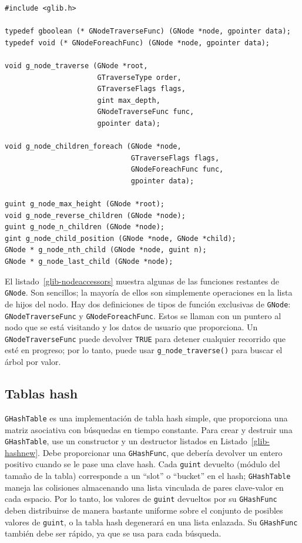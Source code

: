 \begin{lstlisting}[float, caption={Accediendo a un \lstinline{GNode}}, label=glib-nodeaccessors]
#include <glib.h>

typedef gboolean (* GNodeTraverseFunc) (GNode *node, gpointer data);
typedef void (* GNodeForeachFunc) (GNode *node, gpointer data);

void g_node_traverse (GNode *root,
                      GTraverseType order,
                      GTraverseFlags flags,
                      gint max_depth,
                      GNodeTraverseFunc func,
                      gpointer data);

void g_node_children_foreach (GNode *node,
                              GTraverseFlags flags,
                              GNodeForeachFunc func,
                              gpointer data);

guint g_node_max_height (GNode *root);
void g_node_reverse_children (GNode *node);
guint g_node_n_children (GNode *node);
gint g_node_child_position (GNode *node, GNode *child);
GNode * g_node_nth_child (GNode *node, guint n);
GNode * g_node_last_child (GNode *node);
\end{lstlisting}

El listado~\ref{glib-nodeaccessors} muestra algunas de las funciones restantes de \lstinline{GNode}. Son sencillos; la mayoría de ellos son simplemente operaciones en la lista de hijos del nodo. Hay dos definiciones de tipos de función exclusivas de \lstinline{GNode}: \lstinline{GNodeTraverseFunc} y \lstinline{GNodeForeachFunc}. Estos se llaman con un puntero al nodo que se está visitando y los datos de usuario que proporciona. Un \lstinline{GNodeTraverseFunc} puede devolver \lstinline{TRUE} para detener cualquier recorrido que esté en progreso; por lo tanto, puede usar \lstinline{g_node_traverse()} para buscar el árbol por valor.

\subsection{Tablas hash}

\lstinline{GHashTable} es una implementación de tabla hash simple, que proporciona una matriz asociativa con búsquedas en tiempo constante. Para crear y destruir una \lstinline{GHashTable}, use un constructor y un destructor listados en Listado~\ref{glib-hashnew}. Debe proporcionar una \lstinline{GHashFunc}, que debería devolver un entero positivo cuando se le pase una clave hash. Cada \lstinline{guint} devuelto (módulo del tamaño de la tabla) corresponde a un ``slot'' o ``bucket'' en el hash; \lstinline{GHashTable} maneja las colisiones almacenando una lista vinculada de pares clave-valor en cada espacio. Por lo tanto, los valores de \lstinline{guint} devueltos por su \lstinline{GHashFunc} deben distribuirse de manera bastante uniforme sobre el conjunto de posibles valores de \lstinline{guint}, o la tabla hash degenerará en una lista enlazada. Su \lstinline{GHashFunc} también debe ser rápido, ya que se usa para cada búsqueda.

